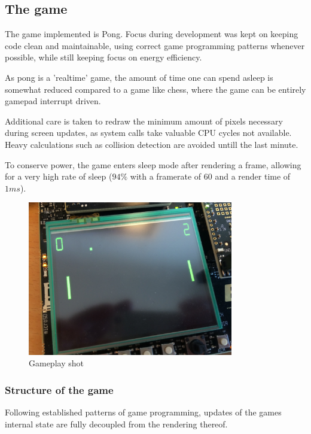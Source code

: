 \subsection{The game}

The game implemented is Pong. Focus during development was kept on keeping code
clean and maintainable, using correct game programming patterns whenever
possible, while still keeping focus on energy efficiency.

As pong is a 'realtime' game, the amount of time one can spend asleep is
somewhat reduced compared to a game like chess,
where the game can be entirely gamepad interrupt driven.

Additional care is taken to redraw the minimum amount of pixels necessary
during screen updates, as system calls take valuable CPU cycles not available.
Heavy calculations such as collision detection are avoided untill the last
minute.

To conserve power, the game enters sleep mode after rendering a frame,
allowing for a very high rate of sleep
($ 94\% $ with a framerate of $ 60 $ and a render time of $ 1 ms $).

\begin{figure}[H]
\centering
\includegraphics[width=0.8\textwidth]{figures/gameplay.jpg}
\caption{Gameplay shot}

\end{figure}

\subsubsection{Structure of the game}

Following established patterns of game programming, updates of the games
internal state are fully decoupled from the rendering thereof.

